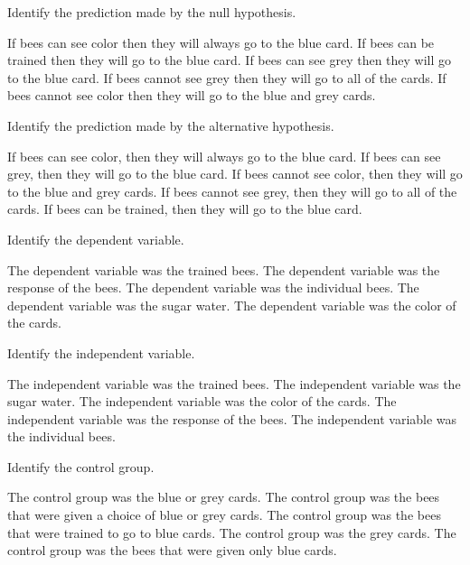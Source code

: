 \question
Identify the prediction made by the null hypothesis.

\begin{choices}
\choice If bees can see color then they will always go to the blue card.
\choice If bees can be trained then they will go to the blue card.
\choice If bees can see grey then they will go to the blue card.
\choice If bees cannot see grey then they will go to all of the cards.
\correctchoice If bees cannot see color then they will go to the blue and grey cards.
\end{choices}

\question
Identify the prediction made by the alternative hypothesis.

\begin{choices}
\correctchoice If bees can see color, then they will always go to the blue card.
\choice If bees can see grey, then they will go to the blue card.
\choice If bees cannot see color, then they will go to the blue and grey cards.
\choice If bees cannot see grey, then they will go to all of the cards.
\choice If bees can be trained, then they will go to the blue card.
\end{choices}

\question
Identify the dependent variable.

\begin{choices}
\choice The dependent variable was the trained bees.
\correctchoice The dependent variable was the response of the bees.
\choice The dependent variable was the individual bees.
\choice The dependent variable was the sugar water.
\choice The dependent variable was the color of the cards.
\end{choices}

\question
Identify the independent variable.

\begin{choices}
\choice The independent variable was the trained bees.
\choice The independent variable was the sugar water.
\correctchoice The independent variable was the color of the cards.
\choice The independent variable was the response of the bees.
\choice The independent variable was the individual bees.
\end{choices}

\question
Identify the control group.

\begin{choices}
\choice The control group was the blue or grey cards.
\choice The control group was the bees that were given a choice of blue or grey cards.
\choice The control group was the bees that were trained to go to blue cards.
\choice The control group was the grey cards.
\correctchoice The control group was the bees that were given only blue cards.
\end{choices}

